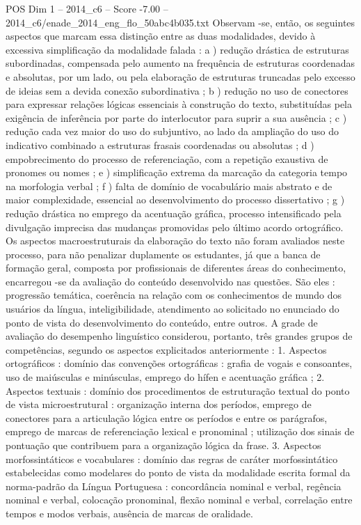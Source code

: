 \begin{textsample}{POS Dim 1 – 2014\_c6 – Score -7.00 – 2014\_c6/enade\_2014\_eng\_flo\_50abc4b035.txt}
Observam -se, então, os seguintes aspectos que marcam essa distinção entre as duas modalidades, devido à excessiva simplificação da modalidade falada : a ) redução drástica de estruturas subordinadas, compensada pelo aumento na frequência de estruturas coordenadas e absolutas, por um lado, ou pela elaboração de estruturas truncadas pelo excesso de ideias sem a devida conexão subordinativa ; b ) redução no uso de conectores para expressar relações lógicas essenciais à construção do texto, substituídas pela exigência de inferência por parte do interlocutor para suprir a sua ausência ; c ) redução cada vez maior do uso do subjuntivo, ao lado da ampliação do uso do indicativo combinado a estruturas frasais coordenadas ou absolutas ; d ) empobrecimento do processo de referenciação, com a repetição exaustiva de pronomes ou nomes ; e ) simplificação extrema da marcação da categoria tempo na morfologia verbal ; f ) falta de domínio de vocabulário mais abstrato e de maior complexidade, essencial ao desenvolvimento do processo dissertativo ; g ) redução drástica no emprego da acentuação gráfica, processo intensificado pela divulgação imprecisa das mudanças promovidas pelo último acordo ortográfico.
Os aspectos macroestruturais da elaboração do texto não foram avaliados neste processo, para não penalizar duplamente os estudantes, já que a banca de formação geral, composta por profissionais de diferentes áreas do conhecimento, encarregou -se da avaliação do conteúdo desenvolvido nas questões.
São eles : progressão temática, coerência na relação com os conhecimentos de mundo dos usuários da língua, inteligibilidade, atendimento ao solicitado no enunciado do ponto de vista do desenvolvimento do conteúdo, entre outros.
A grade de avaliação do desempenho linguístico considerou, portanto, três grandes grupos de competências, segundo os aspectos explicitados anteriormente : 1.
Aspectos ortográficos : domínio das convenções ortográficas : grafia de vogais e consoantes, uso de maiúsculas e minúsculas, emprego do hífen e acentuação gráfica ; 2.
Aspectos textuais : domínio dos procedimentos de estruturação textual do ponto de vista microestrutural : organização interna dos períodos, emprego de conectores para a articulação lógica entre os períodos e entre os parágrafos, emprego de marcas de referenciação lexical e pronominal ; utilização dos sinais de pontuação que contribuem para a organização lógica da frase. 3.
Aspectos morfossintáticos e vocabulares : domínio das regras de caráter morfossintático estabelecidas como modelares do ponto de vista da modalidade escrita formal da norma-padrão da Língua Portuguesa : concordância nominal e verbal, regência nominal e verbal, colocação pronominal, flexão nominal e verbal, correlação entre tempos e modos verbais, ausência de marcas de oralidade.

\end{textsample}
